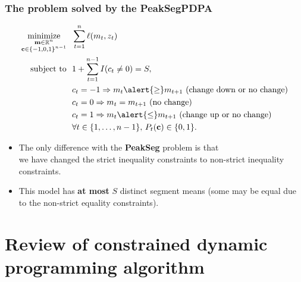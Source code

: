 \documentclass{beamer}
\DeclareMathOperator*{\minimize}{minimize}
\newcommand{\RR}{\mathbb R}
\begin{document}
\begin{frame}
  \frametitle{The problem solved by the PeakSegPDPA}
\begin{align*}
    \minimize_{\substack{
  \mathbf m\in\RR^{n}
\\
  \mathbf c\in\{-1,0,1\}^{n-1}
  }} &\ \ 
    \sum_{t=1}^n \ell( m_t,  z_t) 
  \label{PeakSegPDPA}
\\
    \text{subject to} &\ \  1+ \sum_{t=1}^{n-1} I(c_t \neq 0) = S, 
\nonumber\\
& \ \ c_t = -1 \Rightarrow m_{t} \alert{\geq} m_{t+1} \text{ (change down or no change)}
\nonumber\\
& \ \ c_t = 0 \Rightarrow m_{t} = m_{t+1}  \text{ (no change)}
\nonumber\\
& \ \ c_t = 1 \Rightarrow m_{t} \alert{\leq} m_{t+1} \text{ (change up or no change)}
\nonumber\\
&\ \ \forall t\in\{1, \dots, n-1\},\, P_t(\mathbf c) \in\{0, 1\}.
\nonumber
\end{align*}
\begin{itemize}
\item The only difference with the \textbf{PeakSeg} problem is that\\
  \alert{we have changed the strict inequality constraints to non-strict inequality
constraints}. 
\item This model has \textbf{at most} $S$ distinct
  segment means (some may be equal due to the non-strict equality
  constraints).
\end{itemize}
\end{frame}


\section*{Review of constrained dynamic programming algorithm}






\end{document}
